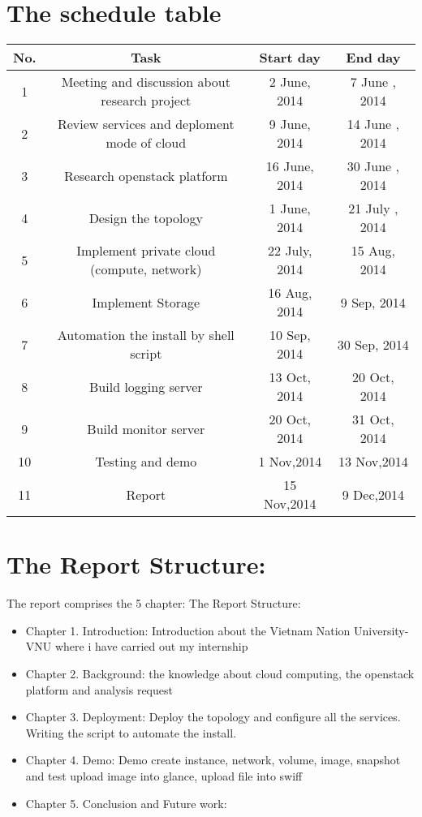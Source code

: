 \section{The schedule table}
\begin{flushleft}
\begin{tabular}{ |c|c|c|c| } 
 \hline
 No. 	& Task 			            													&Start day   		&End day \\ [0.5ex]
 \hline
 1	 	& Meeting and discussion about research project		& 2 June, 2014   & 7 June , 2014\\ 
 \hline 
 2 		& Review services and deploment mode of cloud	  	& 9 June, 2014   & 14 June , 2014 \\ 
 \hline 
 3	 	& Research openstack platform											& 16 June, 2014  & 30 June , 2014 \\ 
 \hline
 4	 	& Design the topology															& 1 June, 2014  & 21 July , 2014 \\ 
 \hline
 5	 	& Implement private cloud (compute, network)			& 22 July, 2014  & 15 Aug, 2014 \\ 
 \hline
 6 		& Implement Storage	  														& 16 Aug, 2014  & 9 Sep, 2014 \\ 
 \hline
 7	 	& Automation the install by shell script					& 10 Sep, 2014  & 30 Sep, 2014 \\ 
 \hline
 8	 	& Build logging server 														& 13 Oct, 2014  & 20 Oct, 2014 \\ 
 \hline
 9	 	& Build monitor server														& 20 Oct, 2014  & 31 Oct, 2014 \\ 
 \hline
 10 	& Testing and demo	 															& 1 Nov,2014  & 13 Nov,2014 \\ 
 \hline
 11	 	& Report																					& 15 Nov,2014  & 9 Dec,2014 \\ 
 
 \hline
\end{tabular}
\end{flushleft}
\section{The Report Structure: }
The report comprises the 5 chapter:
The Report Structure: 
\begin{itemize}
	\item Chapter 1. Introduction: Introduction about the Vietnam Nation University-VNU where i have carried out my internship
	\item Chapter 2. Background: the knowledge about cloud computing, the openstack platform and analysis request
	\item Chapter 3. Deployment: Deploy the topology and configure all the services. Writing the script to automate the install. 
	\item Chapter 4. Demo: Demo create instance, network, volume, image, snapshot and test upload image into glance, upload file into swiff 
	\item Chapter 5. Conclusion and Future work:
\end{itemize}



